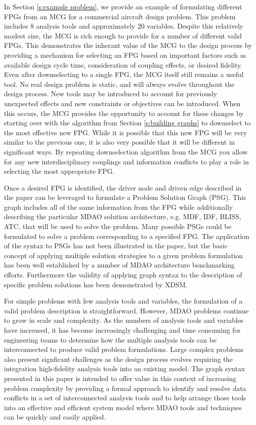 In Section \ref{s:example problem}, we provide an example of 
formulating different FPGs from an MCG for a commercial aircraft design problem. This problem includes 8 
analysis tools and approximately 20 variables. Despite this relatively modest size, 
the MCG is rich enough to provide for a number of different valid FPGs. This demonstrates
the inherant value of the MCG to the design process by providing a mechanism for selecting 
an FPG based on important factors such as available design cycle time, consideration of 
coupling effects, or desired fidelity. Even after downselecting to a single FPG, the 
MCG itself still remains a useful tool. No real design problem is static, and will always
evolve throughout the design process. New tools may be introduced to account for previously 
unexpected effects and new constraints or objectives can be introduced. When this occurs, 
the MCG provides the opportunity to account for these changes by starting over with the 
algorithm from Section \ref{s:building graphs} to downselect to the most effective new FPG. 
While it is possible that this new FPG will be very similar to the previous one, 
it is also very possible that it will be different in significant ways. 
By repeating downselection algorithm from the MCG you allow for any new interdisciplinary couplings and  
information conflicts to play a role in selecting the most appropriate FPG. 

Once a desired FPG is identified, the driver node and driven edge described in the paper can be 
leveraged to formulate a Problem Solution Graph (PSG). This graph includes all of the 
same information from the FPG while additionally describing the particular MDAO 
solution architecture, e.g. MDF, IDF, BLISS, ATC, that will be used to solve the problem.  
Many possible PSGs could be formulated to solve a problem corresponding to a 
specified FPG. The application of the syntax to PSGs has not been illustrated in the paper, 
but the basic concept of applying multiple solution strategies to a given problem 
formulation has been well established by a number of MDAO architecture 
benchmarking efforts. Furthermore the validity of applying 
graph syntax to the description of specific problem solutions has been demonstrated 
by XDSM. 

For simple problems with few analysis tools and variables, the formulation of a 
valid problem description is straightforward.  However, MDAO problems continue to 
grow in scale and complexity. As the numbers of analysis tools and variables have 
increased, it has become increasingly challenging and time consuming for engineering 
teams to determine how the multiple analysis tools can be interconnected to produce 
valid problem formulations. Large complex problems also present signficant challenges
as the design process evolves requiring the integration high-fidelity 
analysis tools into an existing model. The graph syntax presented in this paper 
is intended to offer value in this context of increasing problem complexity by 
providing a formal approach to identify and resolve data conflicts in a set of interconnected
analysis tools and to help arrange those tools into an effective and efficient system model
where MDAO tools and techniques can be quickly and easily applied.  


